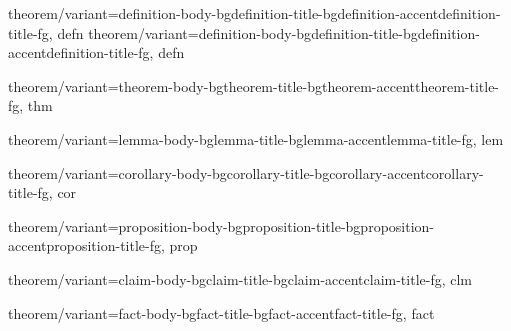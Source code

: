 \ifEnablePlainAmsthmTheorem
    \ifThemeTheoremNumberingNone
        \theoremstyle{plain}
        \newtheorem{fact}{Fact}
        \newtheorem{assumption}{Assumption}
        \newtheorem{axiom}{Axiom}
    \else
        \ifThemeTheoremCounterWithinChapter
            \theoremstyle{plain}
            \newtheorem{fact}{Fact}[chapter]
            \newtheorem{assumption}{Assumption}[chapter]
            \newtheorem{axiom}{Axiom}[chapter]
        \else
            \theoremstyle{plain}
            \newtheorem{fact}{Fact}[section]
            \newtheorem{assumption}{Assumption}[section]
            \newtheorem{axiom}{Axiom}[section]
        \fi
    \fi
    \let\ThemeFactEnvBegin\fact
    \let\ThemeAssumptionEnvBegin\assumption
    \let\ThemeAxiomEnvBegin\axiom
\else
    \ifThemeTheoremNumberingNone
        {
            theorem/variant={definition-body-bg}{definition-title-bg}{definition-accent}{definition-title-fg},
        }{defn}
    \else
        {
            theorem/variant={definition-body-bg}{definition-title-bg}{definition-accent}{definition-title-fg},
        }{defn}
    \fi

    {
        theorem/variant={theorem-body-bg}{theorem-title-bg}{theorem-accent}{theorem-title-fg},
    }{thm}

    {
        theorem/variant={lemma-body-bg}{lemma-title-bg}{lemma-accent}{lemma-title-fg},
    }{lem}

    {
        theorem/variant={corollary-body-bg}{corollary-title-bg}{corollary-accent}{corollary-title-fg},
    }{cor}

    {
        theorem/variant={proposition-body-bg}{proposition-title-bg}{proposition-accent}{proposition-title-fg},
    }{prop}

    {
        theorem/variant={claim-body-bg}{claim-title-bg}{claim-accent}{claim-title-fg},
    }{clm}

    {
        theorem/variant={fact-body-bg}{fact-title-bg}{fact-accent}{fact-title-fg},
    }{fact}

